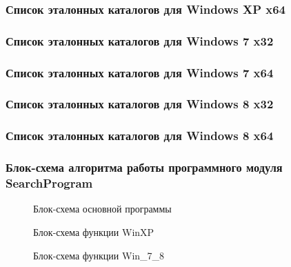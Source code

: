 \subsubsection{Список эталонных каталогов для Windows XP x64}


\subsubsection{Список эталонных каталогов для Windows 7 x32}


\subsubsection{Список эталонных каталогов для Windows 7 x64}


\subsubsection{Список эталонных каталогов для Windows 8 x32}


\subsubsection{Список эталонных каталогов для Windows 8 x64}


\subsubsection{Блок-схема алгоритма работы программного модуля SearchProgram}

\begin{figure}[h!]
\caption{Блок-схема основной программы}
\label{kucher_9:kucher_9}
\end{figure}

\begin{figure}[h!]
\caption{Блок-схема функции WinXP}
\label{kucher_10:kucher_10}
\end{figure}

\begin{figure}[h!]
\caption{Блок-схема функции Win\_7\_8}
\label{kucher_11:kucher_11}
\end{figure}

